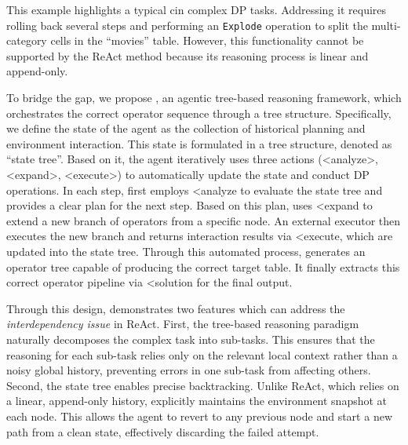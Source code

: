 This example highlights a typical cin complex DP tasks. Addressing it requires rolling back several steps and performing an \texttt{Explode} operation to split the multi-category cells in the ``movies'' table. However, this functionality cannot be supported by the ReAct method because its reasoning process is linear and append-only.

To bridge the gap, we propose \bfsys, an agentic tree-based reasoning framework,
which orchestrates the correct operator sequence through a tree structure. Specifically, we define the state of the agent as the collection of historical planning and environment interaction. This state is formulated in a tree structure, denoted as ``state tree''. Based on it, the agent iteratively uses three actions (<analyze>, <expand>, <execute>) to automatically update the state and conduct DP operations.
In each step, \sys first employs {<analyze} to evaluate the state tree and provides a clear plan for the next step. Based on this plan, \sys uses {<expand} to extend a new branch of operators from a specific node. An external executor then executes the new branch and returns interaction results via {<execute}, which are updated into the state tree. Through this automated process, \sys generates an operator tree capable of producing the correct target table. It finally extracts this correct operator pipeline via {<solution} for the final output.

Through this design, \sys demonstrates two features which can address the \textit{interdependency issue} in ReAct. 
First, the tree-based reasoning paradigm naturally decomposes the complex task into sub-tasks.
This ensures that the reasoning for each sub-task relies only on the relevant local context rather than a noisy global history, preventing errors in one sub-task from affecting others.
Second, the state tree enables {precise backtracking}. 
Unlike ReAct, which relies on a linear, append-only history, \sys explicitly maintains the environment snapshot at each node. This allows the agent to revert to any previous node and start a new path from a clean state, effectively discarding the failed attempt.


